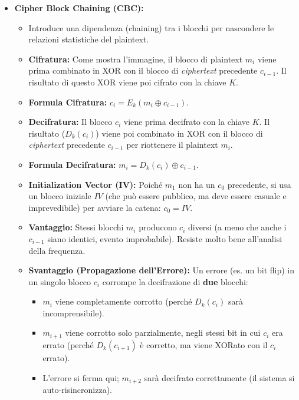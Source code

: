\documentclass[../main.tex]{subfiles}
\begin{document}
\begin{itemize}
	\item \textbf{Cipher Block Chaining (CBC):}
            \begin{itemize}
              \item Introduce una dipendenza (chaining) tra i blocchi per nascondere le relazioni statistiche del plaintext.
              \item \textbf{Cifratura:} Come mostra l'immagine, il blocco di plaintext $m_i$ viene prima combinato in XOR con il blocco di \emph{ciphertext} precedente $c_{i-1}$. Il risultato di questo XOR viene poi cifrato con la chiave $K$.
              \item \textbf{Formula Cifratura:} $c_i = E_k(m_i \oplus c_{i-1})$.
              \item \textbf{Decifratura:} Il blocco $c_i$ viene prima decifrato con la chiave $K$. Il risultato ($D_k(c_i)$) viene poi combinato in XOR con il blocco di \emph{ciphertext} precedente $c_{i-1}$ per riottenere il plaintext $m_i$.
              \item \textbf{Formula Decifratura:} $m_i = D_k(c_i) \oplus c_{i-1}$.
              \item \textbf{Initialization Vector (IV):} Poiché $m_1$ non ha un $c_0$ precedente, si usa un blocco iniziale $IV$ (che può essere pubblico, ma deve essere casuale e imprevedibile) per avviare la catena: $c_0 = IV$.
              \item \textbf{Vantaggio:} Stessi blocchi $m_i$ producono $c_i$ diversi (a meno che anche i $c_{i-1}$ siano identici, evento improbabile). Resiste molto bene all'analisi della frequenza.
              \item \textbf{Svantaggio (Propagazione dell'Errore):} Un errore (es. un bit flip) in un singolo blocco $c_i$ corrompe la decifrazione di \textbf{due} blocchi:
                \begin{itemize}
                  \item $m_i$ viene completamente corrotto (perché $D_k(c_i)$ sarà incomprensibile).
                  \item $m_{i+1}$ viene corrotto solo parzialmente, negli stessi bit in cui $c_i$ era errato (perché $D_k(c_{i+1})$ è corretto, ma viene XORato con il $c_i$ errato).
                  \item L'errore si ferma qui; $m_{i+2}$ sarà decifrato correttamente (il sistema si auto-risincronizza).
                \end{itemize}
              \end{itemize} 
	                

\end{itemize}
\end{document}
